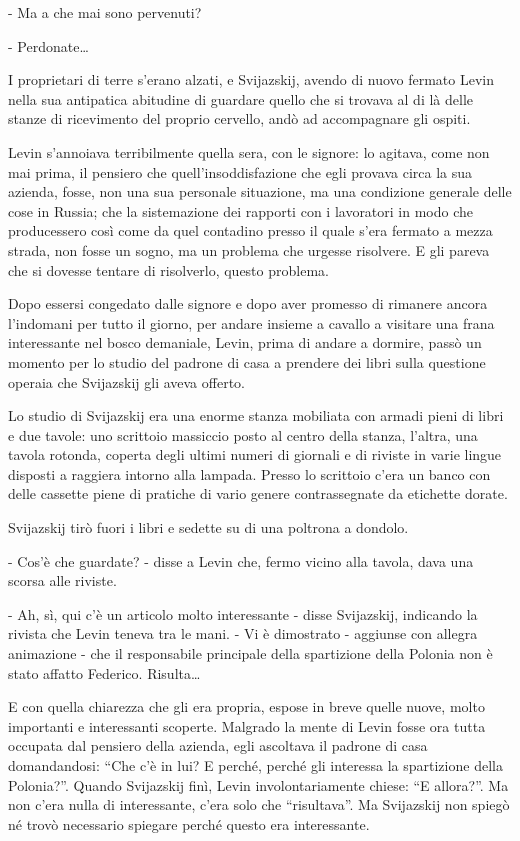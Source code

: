 - Ma a che mai sono pervenuti? 

- Perdonate\ldots{} 
\enlargethispage*{1\baselineskip}

I proprietari di terre s'erano alzati, e Svijazskij, avendo di nuovo fermato Levin nella sua antipatica abitudine di guardare quello che si trovava al di là delle stanze di ricevimento del proprio cervello, andò ad accompagnare gli ospiti. 
\enlargethispage*{1\baselineskip}

Levin s'annoiava terribilmente quella sera, con le signore: lo agitava, come non mai prima, il pensiero che quell'insoddisfazione che egli provava circa la sua azienda, fosse, non una sua personale situazione, ma una condizione generale delle cose in Russia; che la sistemazione dei rapporti con i lavoratori in modo che producessero così come da quel contadino presso il quale s'era fermato a mezza strada, non fosse un sogno, ma un problema che urgesse risolvere. E gli pareva che si dovesse tentare di risolverlo, questo problema. 

Dopo essersi congedato dalle signore e dopo aver promesso di rimanere ancora l'indomani per tutto il giorno, per andare insieme a cavallo a visitare una frana interessante nel bosco demaniale, Levin, prima di andare a dormire, passò un momento per lo studio del padrone di casa a prendere dei libri sulla questione operaia che Svijazskij gli aveva offerto. 

Lo studio di Svijazskij era una enorme stanza mobiliata con armadi pieni di libri e due tavole: uno scrittoio massiccio posto al centro della stanza, l'altra, una tavola rotonda, coperta degli ultimi numeri di giornali e di riviste in varie lingue disposti a raggiera intorno alla lampada. Presso lo scrittoio c'era un banco con delle cassette piene di pratiche di vario genere contrassegnate da etichette dorate. 

Svijazskij tirò fuori i libri e sedette su di una poltrona a dondolo. 

- Cos'è che guardate? - disse a Levin che, fermo vicino alla tavola, dava una scorsa alle riviste. 

- Ah, sì, qui c'è un articolo molto interessante - disse Svijazskij, indicando la rivista che Levin teneva tra le mani. - Vi è dimostrato - aggiunse con allegra animazione - che il responsabile principale della spartizione della Polonia non è stato affatto Federico. Risulta\ldots{} 

E con quella chiarezza che gli era propria, espose in breve quelle nuove, molto importanti e interessanti scoperte. Malgrado la mente di Levin fosse ora tutta occupata dal pensiero della azienda, egli ascoltava il padrone di casa domandandosi: ``Che c'è in lui? E perché, perché gli interessa la spartizione della Polonia?''. Quando Svijazskij finì, Levin involontariamente chiese: ``E allora?''. Ma non c'era nulla di interessante, c'era solo che ``risultava''. Ma Svijazskij non spiegò né trovò necessario spiegare perché questo era interessante. 


